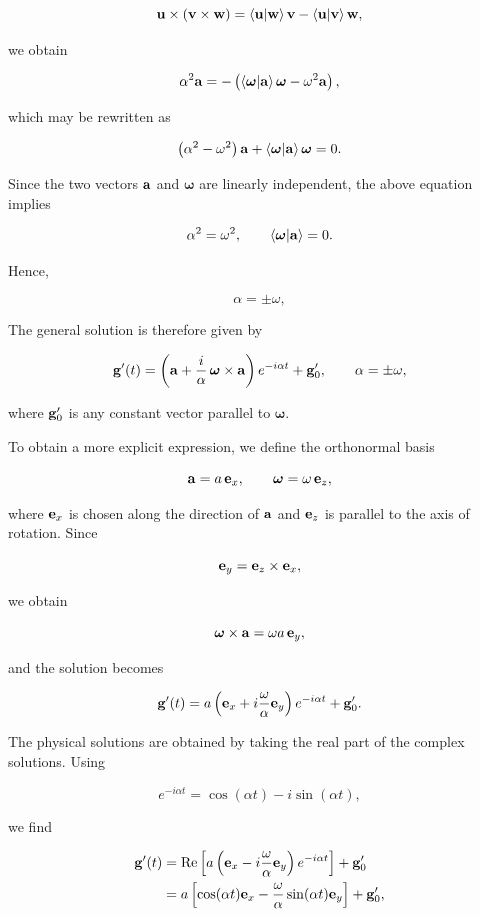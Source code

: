 \documentclass[12pt]{article}
\begin{document}
\[
  \vb u\times(\vb v\times\vb w)
  =
  \ip{\vb u}{\vb w}\vb v
  -
  \ip{\vb u}{\vb v}\vb w,
\]

we obtain

\[
  \alpha^2\vb a
  =
  -\left(
    \ip{\boldsymbol{\omega}}{\vb a}\boldsymbol{\omega}
    -
    \omega^2\vb a
  \right),
\]

which may be rewritten as

\[
  \left(
    \alpha^2-\omega^2
  \right)\vb a
  +
  \ip{\boldsymbol{\omega}}{\vb a}\boldsymbol{\omega}
  =
  0.
\]

Since the two vectors $\vb a$ and $\boldsymbol{\omega}$ are linearly
independent, the above equation implies

\[
  \alpha^2=\omega^2,
  \qquad
  \ip{\boldsymbol{\omega}}{\vb a}=0.
\]

Hence,

\[
  \alpha=\pm\omega,
\]

The general solution is therefore given by

\[
  \vb g'(t)
  =
  \left(
    \vb a
    +
    \frac{i}{\alpha}\,
    \boldsymbol{\omega}\times\vb a
  \right)
  e^{-i\alpha t}
  +
  \vb g_0',
  \qquad
  \alpha=\pm\omega,
\]

where $\vb g_0'$ is any constant vector parallel to
$\boldsymbol{\omega}$.

To obtain a more explicit expression, we define the orthonormal basis

\[
  \vb a=a\,\vb e_x,
  \qquad
  \boldsymbol{\omega}=\omega\,\vb e_z,
\]

where $\vb e_x$ is chosen along the direction of $\vb a$ and
$\vb e_z$ is parallel to the axis of rotation. Since

\[
  \vb e_y=\vb e_z\times\vb e_x,
\]

we obtain

\[
  \boldsymbol{\omega}\times\vb a
  =
  \omega a\,\vb e_y,
\]

and the solution becomes

\[
  \vb g'(t)
  =
  a
  \left(
    \vb e_x
    +
    i\frac{\omega}{\alpha}\vb e_y
  \right)
  e^{-i\alpha t}
  +
  \vb g_0'.
\]

The physical solutions are obtained by taking the real part of the complex
solutions. Using

\[
  e^{-i\alpha t}
  =
  \cos(\alpha t)-i\sin(\alpha t),
\]

we find

\[
\begin{aligned}
  \vb g'(t)
  &=
  \Re\left[
    a\left(
      \vb e_x
      -
      i\frac{\omega}{\alpha}\vb e_y
    \right)
    e^{-i\alpha t}
  \right]
  +
  \vb g'_0
  \\
  &=
  a\left[
    \cos(\alpha t)\vb e_x
    -
    \frac{\omega}{\alpha}
    \sin(\alpha t)\vb e_y
  \right]
  +
  \vb g'_0,
\end{aligned}
\]
\end{document}
